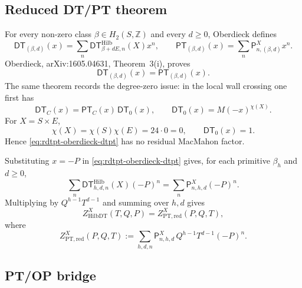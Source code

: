 \subsection{Reduced DT/PT theorem}

For every non-zero class \(\beta\in H_2(S,\mathbb Z)\) and every
\(d\geq0\), Oberdieck defines
\begin{equation}
\label{eq:rdtpt-fixed-series}
\mathsf{DT}_{(\beta,d)}(x)
=
\sum_n\mathsf{DT}^{\mathrm{Hilb}}_{\beta+dE,n}(X)x^n,
\qquad
\mathsf{PT}_{(\beta,d)}(x)
=
\sum_n\mathsf P^X_{n,(\beta,d)}x^n.
\end{equation}
Oberdieck, arXiv:1605.04631, Theorem~3(i), proves
\begin{equation}
\label{eq:rdtpt-oberdieck-dtpt}
\mathsf{DT}_{(\beta,d)}(x)=\mathsf{PT}_{(\beta,d)}(x).
\end{equation}
The same theorem records the degree-zero issue: in the local wall
crossing one first has
\[
\mathsf{DT}_C(x)=\mathsf{PT}_C(x)\,\mathsf{DT}_0(x),
\qquad
\mathsf{DT}_0(x)=M(-x)^{\chi(X)}.
\]
For \(X=S\times E\),
\[
\chi(X)=\chi(S)\chi(E)=24\cdot0=0,
\qquad
\mathsf{DT}_0(x)=1.
\]
Hence \eqref{eq:rdtpt-oberdieck-dtpt} has no residual MacMahon factor.

Substituting \(x=-P\) in \eqref{eq:rdtpt-oberdieck-dtpt} gives, for
each primitive \(\beta_h\) and \(d\geq0\),
\begin{equation}
\label{eq:rdtpt-coefficient-comparison}
\sum_n
\mathsf{DT}^{\mathrm{Hilb}}_{h,d,n}(X)(-P)^n
=
\sum_n
\mathsf P^X_{n,h,d}(-P)^n.
\end{equation}
Multiplying by \(Q^{h-1}T^{d-1}\) and summing over \(h,d\) gives
\begin{equation}
\label{eq:rdtpt-hilbdt-pt-series}
Z^X_{\mathrm{HilbDT}}(T,Q,P)
=
Z^X_{\mathrm{PT,red}}(P,Q,T),
\end{equation}
where
\begin{equation}
\label{eq:rdtpt-pt-series}
Z^X_{\mathrm{PT,red}}(P,Q,T)
:=
\sum_{h,d,n}
\mathsf P^X_{n,h,d}\,Q^{h-1}T^{d-1}(-P)^n.
\end{equation}

\subsection{PT/OP bridge}

